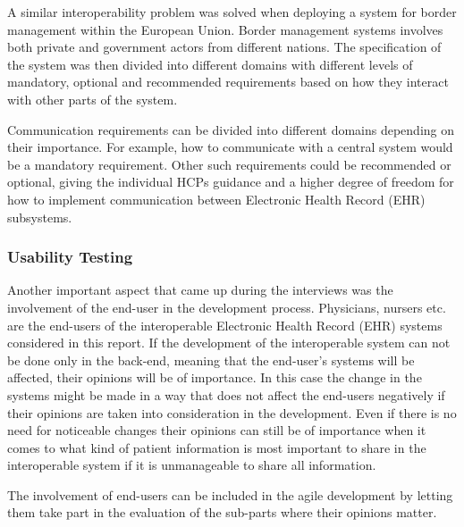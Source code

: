 \documentclass[14pt]{article}
\begin{document}
A similar interoperability problem was solved when deploying a system for border management within the European Union. Border management systems involves both private and government actors from different nations. The specification of the system was then divided into different domains with different levels of mandatory, optional and recommended requirements based on how they interact with other parts of the system. \cite{BorderMgmt}

Communication requirements can be divided into different domains depending on their importance. For example, how to communicate with a central system would be a mandatory requirement. Other such requirements could be recommended or optional, giving the individual \glspl{HCP} guidance and a higher degree of freedom for how to implement communication between Electronic Health Record (EHR) subsystems. 

\subsubsection{Usability Testing}
\label{sec:resultsUsabilityTesting}
Another important aspect that came up during the interviews was the involvement of the end-user in the development process. Physicians, nursers etc. are the end-users of the interoperable Electronic Health Record (\gls{EHR}) systems considered in this report. If the development of the interoperable system can not be done only in the back-end, meaning that the end-user's systems will be affected, their opinions will be of importance. In this case the change in the systems might be made in a way that does not affect the end-users negatively if their opinions are taken into consideration in the development. Even if there is no need for noticeable changes their opinions can still be of importance when it comes to what kind of patient information is most important to share in the interoperable system if it is unmanageable to share all information. 

The involvement of end-users can be included in the agile development by letting them take part in the evaluation of the sub-parts where their opinions matter. 
\end{document}
